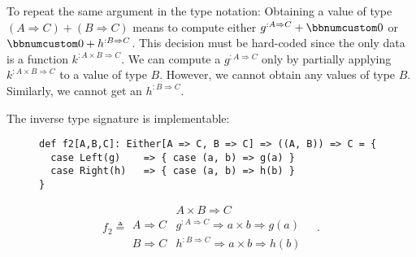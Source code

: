 To repeat the same argument in the type notation: Obtaining a value
of type $(A\Rightarrow C)+(B\Rightarrow C)$ means to compute either
$g^{:A\Rightarrow C}+\bbnum 0$ or $\bbnum 0+h^{:B\Rightarrow C}$.
This decision must be hard-coded since the only data is a function
$k^{:A\times B\Rightarrow C}$. We can compute a $g^{:A\Rightarrow C}$
only by partially applying $k^{:A\times B\Rightarrow C}$ to a value
of type $B$. However, we cannot obtain any values of type $B$. Similarly,
we cannot get an $h^{:B\Rightarrow C}$.

The inverse type signature is implementable:\hfill{}~\begin{wrapfigure}{l}{0.5\columnwidth}%
\vspace{-0.8\baselineskip}
\begin{lstlisting}
def f2[A,B,C]: Either[A => C, B => C] => ((A, B)) => C = {
  case Left(g)    => { case (a, b) => g(a) }
  case Right(h)   => { case (a, b) => h(b) }
}
\end{lstlisting}

\vspace{-1.3\baselineskip}
\end{wrapfigure}%
\vspace{-0.9\baselineskip}
\[
f_{2}\triangleq\begin{array}{|c||c|}
 & A\times B\Rightarrow C\\
\hline A\Rightarrow C & g^{:A\Rightarrow C}\Rightarrow a\times b\Rightarrow g(a)\\
B\Rightarrow C & h^{:B\Rightarrow C}\Rightarrow a\times b\Rightarrow h(b)
\end{array}\quad.
\]
\vspace{-1.3\baselineskip}

